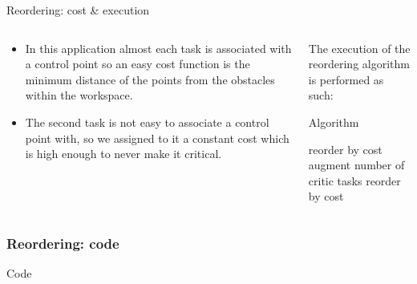 \documentclass[11pt]{beamer}
\begin{document}
\begin{frame}{Reordering: cost \& execution}
\begin{columns}

\begin{column}{.4\textwidth}
\begin{itemize}
\item In this application almost each task is associated with a control point so an easy cost function is the minimum distance of the points from the obstacles within the workspace.
\item The second task is not easy to associate a control point with, so we assigned to it a constant cost which is high enough to never make it critical.
\end{itemize}
\end{column}

\begin{column}{.6\textwidth}
The execution of the reordering algorithm is performed as such:
\begin{block}{Algorithm}
\begin{algorithmic}[1]
\State reorder by cost
\State augment number of critic tasks
\EndIf
\EndFor
{}
\State reorder by cost
\EndFor
\end{algorithmic}
\end{block}
\end{column}

\end{columns}
\end{frame}

\begin{frame}[fragile]
\frametitle{Reordering: code}
\begin{block}{Code}
\begin{adjustbox}{width=\textwidth}

\end{adjustbox}
\end{block}
\end{frame}
\end{document}
